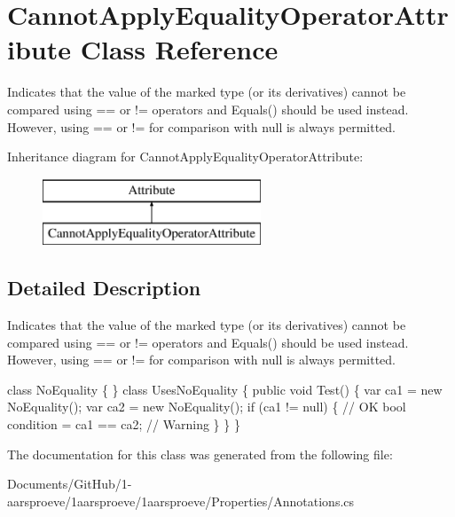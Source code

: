 \hypertarget{class_cannot_apply_equality_operator_attribute}{}\section{Cannot\+Apply\+Equality\+Operator\+Attribute Class Reference}
\label{class_cannot_apply_equality_operator_attribute}


Indicates that the value of the marked type (or its derivatives) cannot be compared using \textquotesingle{}==\textquotesingle{} or \textquotesingle{}!=\textquotesingle{} operators and {\ttfamily Equals()} should be used instead. However, using \textquotesingle{}==\textquotesingle{} or \textquotesingle{}!=\textquotesingle{} for comparison with {\ttfamily null} is always permitted.  


Inheritance diagram for Cannot\+Apply\+Equality\+Operator\+Attribute\+:\begin{figure}[H]
\begin{center}
\leavevmode
\includegraphics[height=2.000000cm]{class_cannot_apply_equality_operator_attribute}
\end{center}
\end{figure}


\subsection{Detailed Description}
Indicates that the value of the marked type (or its derivatives) cannot be compared using \textquotesingle{}==\textquotesingle{} or \textquotesingle{}!=\textquotesingle{} operators and {\ttfamily Equals()} should be used instead. However, using \textquotesingle{}==\textquotesingle{} or \textquotesingle{}!=\textquotesingle{} for comparison with {\ttfamily null} is always permitted. 


\begin{DoxyCode}
[CannotApplyEqualityOperator]
\textcolor{keyword}{class }NoEquality \{ \}
\textcolor{keyword}{class }UsesNoEquality \{
  \textcolor{keyword}{public} \textcolor{keywordtype}{void} Test() \{
    var ca1 = \textcolor{keyword}{new} NoEquality();
    var ca2 = \textcolor{keyword}{new} NoEquality();
    \textcolor{keywordflow}{if} (ca1 != null) \{ \textcolor{comment}{// OK}
      \textcolor{keywordtype}{bool} condition = ca1 == ca2; \textcolor{comment}{// Warning}
    \}
  \}
\}
\end{DoxyCode}


The documentation for this class was generated from the following file\+:\begin{DoxyCompactItemize}
\item 
Documents/\+Git\+Hub/1-\/aarsproeve/1aarsproeve/1aarsproeve/\+Properties/Annotations.\+cs\end{DoxyCompactItemize}
